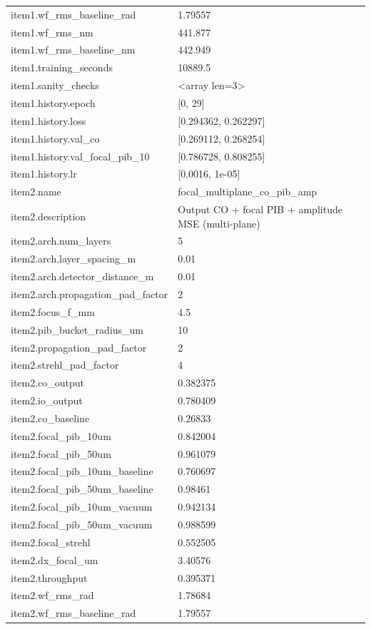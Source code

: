 \begin{longtable}{p{}p{}}
item1.wf\_rms\_baseline\_rad & 1.79557\\
item1.wf\_rms\_nm & 441.877\\
item1.wf\_rms\_baseline\_nm & 442.949\\
item1.training\_seconds & 10889.5\\
item1.sanity\_checks & <array len=3>\\
item1.history.epoch & [0, 29]\\
item1.history.loss & [0.294362, 0.262297]\\
item1.history.val\_co & [0.269112, 0.268254]\\
item1.history.val\_focal\_pib\_10 & [0.786728, 0.808255]\\
item1.history.lr & [0.0016, 1e-05]\\
item2.name & focal\_multiplane\_co\_pib\_amp\\
item2.description & Output CO + focal PIB + amplitude MSE (multi-plane)\\
item2.arch.num\_layers & 5\\
item2.arch.layer\_spacing\_m & 0.01\\
item2.arch.detector\_distance\_m & 0.01\\
item2.arch.propagation\_pad\_factor & 2\\
item2.focus\_f\_mm & 4.5\\
item2.pib\_bucket\_radius\_um & 10\\
item2.propagation\_pad\_factor & 2\\
item2.strehl\_pad\_factor & 4\\
item2.co\_output & 0.382375\\
item2.io\_output & 0.780409\\
item2.co\_baseline & 0.26833\\
item2.focal\_pib\_10um & 0.842004\\
item2.focal\_pib\_50um & 0.961079\\
item2.focal\_pib\_10um\_baseline & 0.760697\\
item2.focal\_pib\_50um\_baseline & 0.98461\\
item2.focal\_pib\_10um\_vacuum & 0.942134\\
item2.focal\_pib\_50um\_vacuum & 0.988599\\
item2.focal\_strehl & 0.552505\\
item2.dx\_focal\_um & 3.40576\\
item2.throughput & 0.395371\\
item2.wf\_rms\_rad & 1.78684\\
item2.wf\_rms\_baseline\_rad & 1.79557\\

\end{longtable}

